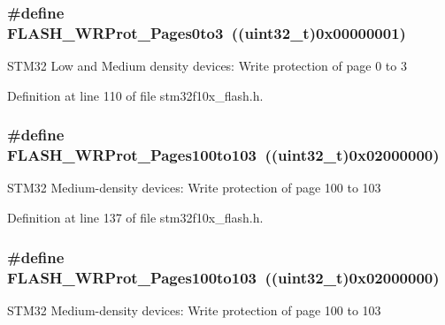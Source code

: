 \subsubsection[{\texorpdfstring{F\+L\+A\+S\+H\+\_\+\+W\+R\+Prot\+\_\+\+Pages0to3}{FLASH_WRProt_Pages0to3}}]{\setlength{\rightskip}{0pt plus 5cm}\#define F\+L\+A\+S\+H\+\_\+\+W\+R\+Prot\+\_\+\+Pages0to3~(({\bf uint32\+\_\+t})0x00000001)}\hypertarget{group___option___bytes___write___protection_gac5c6f6155e4ebae0978a3d2a0d991e68}{}\label{group___option___bytes___write___protection_gac5c6f6155e4ebae0978a3d2a0d991e68}
S\+T\+M32 Low and Medium density devices\+: Write protection of page 0 to 3 

Definition at line 110 of file stm32f10x\+\_\+flash.\+h.

\subsubsection[{\texorpdfstring{F\+L\+A\+S\+H\+\_\+\+W\+R\+Prot\+\_\+\+Pages100to103}{FLASH_WRProt_Pages100to103}}]{\setlength{\rightskip}{0pt plus 5cm}\#define F\+L\+A\+S\+H\+\_\+\+W\+R\+Prot\+\_\+\+Pages100to103~(({\bf uint32\+\_\+t})0x02000000)}\hypertarget{group___option___bytes___write___protection_ga0c03cee6931c623ccdaae19233c81f4e}{}\label{group___option___bytes___write___protection_ga0c03cee6931c623ccdaae19233c81f4e}
S\+T\+M32 Medium-\/density devices\+: Write protection of page 100 to 103 

Definition at line 137 of file stm32f10x\+\_\+flash.\+h.

\subsubsection[{\texorpdfstring{F\+L\+A\+S\+H\+\_\+\+W\+R\+Prot\+\_\+\+Pages100to103}{FLASH_WRProt_Pages100to103}}]{\setlength{\rightskip}{0pt plus 5cm}\#define F\+L\+A\+S\+H\+\_\+\+W\+R\+Prot\+\_\+\+Pages100to103~(({\bf uint32\+\_\+t})0x02000000)}\hypertarget{group___option___bytes___write___protection_ga0c03cee6931c623ccdaae19233c81f4e}{}\label{group___option___bytes___write___protection_ga0c03cee6931c623ccdaae19233c81f4e}
S\+T\+M32 Medium-\/density devices\+: Write protection of page 100 to 103 

